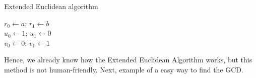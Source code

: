 \documentclass[../lecture-notes.tex]{subfiles}
\begin{document}
\begin{algorithm}
    \caption{Extended Euclidean algorithm} \label{alg:extended_euclidean}
        
    $r_{0} \gets a; \, r_{1} \gets b$ \\ %
    $u_{0} \gets 1; \, u_{1} \gets 0$ \\
    $v_{0} \gets 0; \, v_{1} \gets 1$ \\

\end{algorithm}

Hence, we already know how the Extended Euclidean Algorithm works, but this method is not human-friendly. Next, example of a easy way to find the GCD.
\end{document}
